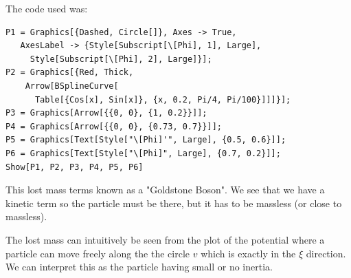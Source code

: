 \documentclass[a4,10pt,titlepage]{article}
\renewcommand\[{\begin{equation*}}
\renewcommand\]{\end{equation*}}
\numberwithin{equation}{section}
\begin{document}
The code used was:
\begin{lstlisting}
P1 = Graphics[{Dashed, Circle[]}, Axes -> True, 
   AxesLabel -> {Style[Subscript[\[Phi], 1], Large], 
     Style[Subscript[\[Phi], 2], Large]}];
P2 = Graphics[{Red, Thick, 
    Arrow[BSplineCurve[
      Table[{Cos[x], Sin[x]}, {x, 0.2, Pi/4, Pi/100}]]]}];
P3 = Graphics[Arrow[{{0, 0}, {1, 0.2}}]];
P4 = Graphics[Arrow[{{0, 0}, {0.73, 0.7}}]];
P5 = Graphics[Text[Style["\[Phi]'", Large], {0.5, 0.6}]];
P6 = Graphics[Text[Style["\[Phi]", Large], {0.7, 0.2}]];
Show[P1, P2, P3, P4, P5, P6]
\end{lstlisting}
This lost mass terms known as a "Goldstone Boson". We see that we have a kinetic term so the particle must be there, but it has to be massless (or close to massless).

The lost mass can intuitively be seen from the plot of the potential where a particle can move freely along the the circle $v$ which is exactly in the $\xi$ direction. We can interpret this as the particle having small or no inertia.
\end{document}
